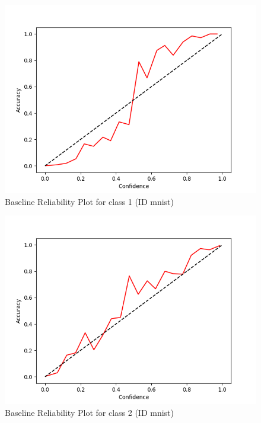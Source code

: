 \documentclass[11pt]{article}
\begin{document}
\begin{figure}[htbp]
\centering
\includegraphics[width=.9\linewidth]{./base_mnist_rel_1.png}
\caption{\label{fig:orgf25634d}
Baseline Reliability Plot for class 1 (ID mnist)}
\end{figure}

\begin{figure}[htbp]
\centering
\includegraphics[width=.9\linewidth]{./base_mnist_rel_2.png}
\caption{\label{fig:org03feedd}
Baseline Reliability Plot for class 2 (ID mnist)}
\end{figure}
\end{document}
